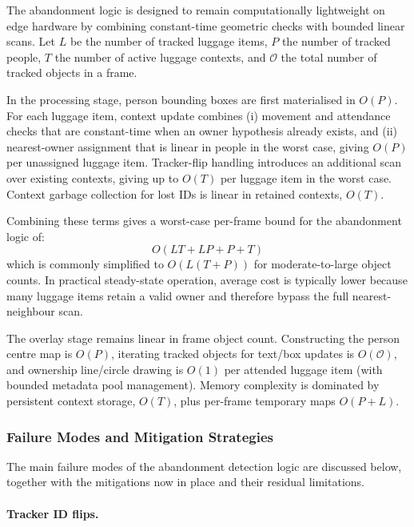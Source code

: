 The abandonment logic is designed to remain computationally lightweight on edge
hardware by combining constant-time geometric checks with bounded linear scans.
Let $L$ be the number of tracked luggage items, $P$ the number of tracked
people, $T$ the number of active luggage contexts, and $\mathcal{O}$ the total
number of tracked objects in a frame.

In the processing stage, person bounding boxes are first materialised in
$O(P)$. For each luggage item, context update combines (i) movement and
attendance checks that are constant-time when an owner hypothesis already
exists, and (ii) nearest-owner assignment that is linear in people in the worst
case, giving $O(P)$ per unassigned luggage item. Tracker-flip handling
introduces an additional scan over existing contexts, giving up to $O(T)$ per
luggage item in the worst case. Context garbage collection for lost IDs is
linear in retained contexts, $O(T)$.

Combining these terms gives a worst-case per-frame bound for the abandonment
logic of:
\begin{equation}
	O(LT + LP + P + T)
\end{equation}
which is commonly simplified to $O(L(T+P))$ for moderate-to-large
object counts. In practical steady-state operation, average cost is typically
lower because many luggage items retain a valid owner and therefore bypass the
full nearest-neighbour scan.

The overlay stage remains linear in frame object count. Constructing the person
centre map is $O(P)$, iterating tracked objects for text/box updates is
$O(\mathcal{O})$, and ownership line/circle drawing is $O(1)$ per attended
luggage item (with bounded metadata pool management). Memory complexity is
dominated by persistent context storage, $O(T)$, plus per-frame temporary maps
$O(P+L)$.

\subsubsection{Failure Modes and Mitigation Strategies}
\label{sec:failure_modes_and_mitigation_strategies}

The main failure modes of the abandonment detection logic are discussed below,
together with the mitigations now in place and their residual limitations.

\paragraph{Tracker ID flips.}

